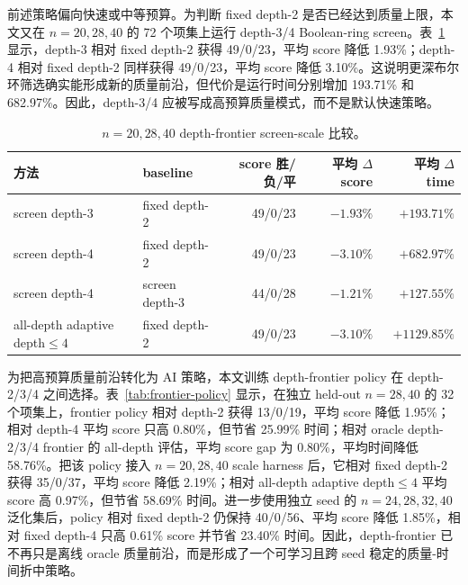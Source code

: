 \documentclass[UTF8,fontset=macnew,11pt]{ctexart}
\newcommand{\screen}{Boolean-ring screen}
\begin{document}
前述策略偏向快速或中等预算。为判断 fixed depth-2 是否已经达到质量上限，本文又在 $n=20,28,40$ 的 72 个项集上运行 depth-3/4 \screen{}。表~\ref{tab:frontier} 显示，depth-3 相对 fixed depth-2 获得 49/0/23，平均 score 降低 1.93\%；depth-4 相对 fixed depth-2 同样获得 49/0/23，平均 score 降低 3.10\%。这说明更深布尔环筛选确实能形成新的质量前沿，但代价是运行时间分别增加 193.71\% 和 682.97\%。因此，depth-3/4 应被写成高预算质量模式，而不是默认快速策略。

\begin{table}[H]
\centering
\scriptsize
\caption{$n=20,28,40$ depth-frontier screen-scale 比较。}
\label{tab:frontier}
\begin{tabular}{llrrr}
\toprule
方法 & baseline & score 胜/负/平 & 平均 $\Delta$ score & 平均 $\Delta$ time \\
\midrule
screen depth-3 & fixed depth-2 & 49/0/23 & $-1.93\%$ & $+193.71\%$ \\
screen depth-4 & fixed depth-2 & 49/0/23 & $-3.10\%$ & $+682.97\%$ \\
screen depth-4 & screen depth-3 & 44/0/28 & $-1.21\%$ & $+127.55\%$ \\
all-depth adaptive depth$\leq4$ & fixed depth-2 & 49/0/23 & $-3.10\%$ & $+1129.85\%$ \\
\bottomrule
\end{tabular}
\end{table}

为把高预算质量前沿转化为 AI 策略，本文训练 depth-frontier policy 在 depth-2/3/4 之间选择。表~\ref{tab:frontier-policy} 显示，在独立 held-out $n=28,40$ 的 32 个项集上，frontier policy 相对 depth-2 获得 13/0/19，平均 score 降低 1.95\%；相对 depth-4 平均 score 只高 0.80\%，但节省 25.99\% 时间；相对 oracle depth-2/3/4 frontier 的 all-depth 评估，平均 score gap 为 0.80\%，平均时间降低 58.76\%。把该 policy 接入 $n=20,28,40$ scale harness 后，它相对 fixed depth-2 获得 35/0/37，平均 score 降低 2.19\%；相对 all-depth adaptive depth$\leq4$ 平均 score 高 0.97\%，但节省 58.69\% 时间。进一步使用独立 seed 的 $n=24,28,32,40$ 泛化集后，policy 相对 fixed depth-2 仍保持 40/0/56、平均 score 降低 1.85\%，相对 fixed depth-4 只高 0.61\% score 并节省 23.40\% 时间。因此，depth-frontier 已不再只是离线 oracle 质量前沿，而是形成了一个可学习且跨 seed 稳定的质量-时间折中策略。
\end{document}
